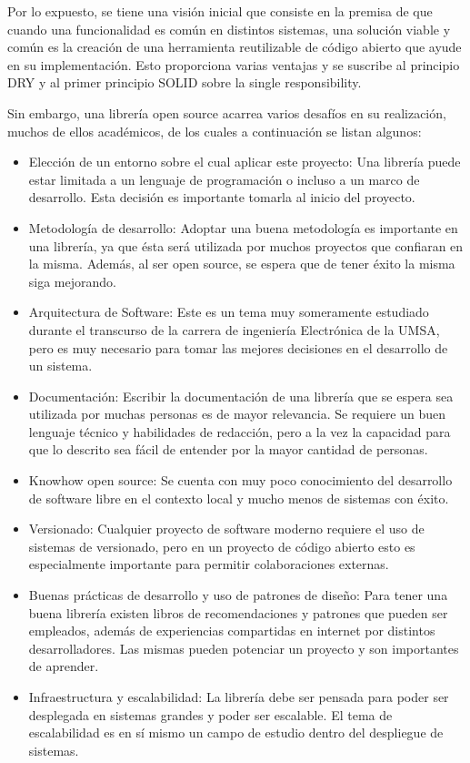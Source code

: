 Por lo expuesto, se tiene una visión inicial que consiste en la premisa de que
cuando una funcionalidad es común en distintos sistemas, una solución viable y común
es la creación de una herramienta reutilizable de código abierto que ayude en su
implementación. Esto proporciona varias ventajas y se suscribe al principio DRY
 y al primer principio SOLID sobre la single responsibility.

Sin embargo, una librería open source acarrea varios desafíos en su realización,
muchos de ellos académicos, de los cuales a continuación se listan algunos:

\begin{itemize}
	\item Elección de un entorno sobre el cual aplicar este proyecto: Una librería
		puede estar limitada a un lenguaje de programación o incluso a un marco de
		desarrollo. Esta decisión es importante tomarla al inicio del proyecto.

	\item Metodología de desarrollo: Adoptar una buena metodología es importante
		en una librería, ya que ésta será utilizada por muchos proyectos que confiaran
		en la misma. Además, al ser open source, se espera que de tener éxito la
		misma siga mejorando.

	\item Arquitectura de Software: Este es un tema muy someramente estudiado
		durante el transcurso de la carrera de ingeniería Electrónica de la UMSA, pero
		es muy necesario para tomar las mejores decisiones en el desarrollo de un sistema.

	\item Documentación: Escribir la documentación de una librería que se espera
		sea utilizada por muchas personas es de mayor relevancia. Se requiere un buen
		lenguaje técnico y habilidades de redacción, pero a la vez la capacidad para
		que lo descrito sea fácil de entender por la mayor cantidad de personas.

	\item Knowhow open source: Se cuenta con muy poco conocimiento del desarrollo
		de software libre en el contexto local y mucho menos de sistemas con éxito.

	\item Versionado: Cualquier proyecto de software moderno requiere el uso de
		sistemas de versionado, pero en un proyecto de código abierto esto es especialmente
		importante para permitir colaboraciones externas.

	\item Buenas prácticas de desarrollo y uso de patrones de diseño: Para tener
		una buena librería existen libros de recomendaciones y patrones que pueden
		ser empleados, además de experiencias compartidas en internet por distintos desarrolladores.
		Las mismas pueden potenciar un proyecto y son importantes de aprender.

	\item Infraestructura y escalabilidad: La librería debe ser pensada para poder
		ser desplegada en sistemas grandes y poder ser escalable. El tema de escalabilidad
		es en sí mismo un campo de estudio dentro del despliegue de sistemas.
\end{itemize}